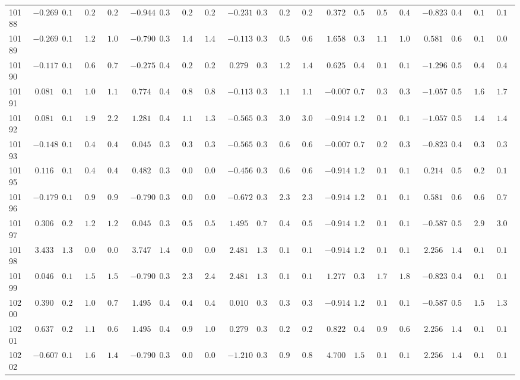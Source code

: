 \documentclass[6pt]{article}
\begin{document}
\begin{landscape}
{\begin{longtable}{lrrrrrrrrrrrrrrrrrrrr}
10188&$-0.269$&$0.173$&$0.261$&$0.248$&$-0.944$&$0.376$&$0.205$&$0.205$&$-0.231$&$0.346$&$0.243$&$0.233$&$ 0.372$&$0.563$&$0.530$&$0.438$&$-0.823$&$0.499$&$0.101$&$0.100$\tabularnewline
10189&$-0.269$&$0.173$&$1.213$&$1.010$&$-0.790$&$0.389$&$1.412$&$1.439$&$-0.113$&$0.354$&$0.599$&$0.616$&$ 1.658$&$0.376$&$1.136$&$1.096$&$ 0.581$&$0.677$&$0.154$&$0.093$\tabularnewline
10190&$-0.117$&$0.178$&$0.697$&$0.774$&$-0.275$&$0.402$&$0.272$&$0.268$&$ 0.279$&$0.393$&$1.277$&$1.423$&$ 0.625$&$0.488$&$0.148$&$0.100$&$-1.296$&$0.509$&$0.472$&$0.498$\tabularnewline
10191&$ 0.081$&$0.188$&$1.074$&$1.161$&$ 0.774$&$0.401$&$0.821$&$0.878$&$-0.113$&$0.354$&$1.116$&$1.184$&$-0.007$&$0.714$&$0.316$&$0.348$&$-1.057$&$0.501$&$1.676$&$1.705$\tabularnewline
10192&$ 0.081$&$0.188$&$1.990$&$2.285$&$ 1.281$&$0.457$&$1.176$&$1.304$&$-0.565$&$0.334$&$3.047$&$3.084$&$-0.914$&$1.254$&$0.135$&$0.149$&$-1.057$&$0.501$&$1.495$&$1.458$\tabularnewline
10193&$-0.148$&$0.177$&$0.463$&$0.473$&$ 0.045$&$0.393$&$0.301$&$0.301$&$-0.565$&$0.334$&$0.648$&$0.671$&$-0.007$&$0.714$&$0.299$&$0.321$&$-0.823$&$0.499$&$0.356$&$0.360$\tabularnewline
10195&$ 0.116$&$0.190$&$0.477$&$0.417$&$ 0.482$&$0.389$&$0.097$&$0.098$&$-0.456$&$0.337$&$0.694$&$0.648$&$-0.914$&$1.254$&$0.135$&$0.149$&$ 0.214$&$0.594$&$0.256$&$0.188$\tabularnewline
10196&$-0.179$&$0.176$&$0.960$&$0.999$&$-0.790$&$0.389$&$0.054$&$0.055$&$-0.672$&$0.332$&$2.341$&$2.358$&$-0.914$&$1.254$&$0.135$&$0.149$&$ 0.581$&$0.677$&$0.678$&$0.730$\tabularnewline
10197&$ 0.306$&$0.204$&$1.249$&$1.259$&$ 0.045$&$0.393$&$0.562$&$0.568$&$ 1.495$&$0.741$&$0.470$&$0.516$&$-0.914$&$1.254$&$0.135$&$0.149$&$-0.587$&$0.505$&$2.915$&$3.082$\tabularnewline
10198&$ 3.433$&$1.352$&$0.030$&$0.034$&$ 3.747$&$1.435$&$0.083$&$0.086$&$ 2.481$&$1.316$&$0.105$&$0.119$&$-0.914$&$1.254$&$0.135$&$0.149$&$ 2.256$&$1.456$&$0.164$&$0.191$\tabularnewline
10199&$ 0.046$&$0.186$&$1.503$&$1.549$&$-0.790$&$0.389$&$2.383$&$2.418$&$ 2.481$&$1.316$&$0.105$&$0.119$&$ 1.277$&$0.383$&$1.793$&$1.898$&$-0.823$&$0.499$&$0.101$&$0.100$\tabularnewline
10200&$ 0.390$&$0.212$&$1.049$&$0.755$&$ 1.495$&$0.495$&$0.461$&$0.473$&$ 0.010$&$0.363$&$0.341$&$0.350$&$-0.914$&$1.254$&$0.135$&$0.149$&$-0.587$&$0.505$&$1.515$&$1.343$\tabularnewline
10201&$ 0.637$&$0.240$&$1.181$&$0.671$&$ 1.495$&$0.495$&$0.942$&$1.004$&$ 0.279$&$0.393$&$0.242$&$0.281$&$ 0.822$&$0.443$&$0.902$&$0.618$&$ 2.256$&$1.456$&$0.164$&$0.191$\tabularnewline
10202&$-0.607$&$0.166$&$1.613$&$1.457$&$-0.790$&$0.389$&$0.054$&$0.055$&$-1.210$&$0.340$&$0.914$&$0.856$&$ 4.700$&$1.542$&$0.119$&$0.147$&$ 2.256$&$1.456$&$0.164$&$0.191$\tabularnewline

\end{longtable}}
\end{landscape}
\end{document}

